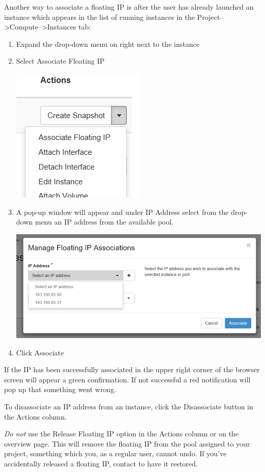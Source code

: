 Another way to associate a floating IP is after the user has already launched an instance which appears in the list of running instances in the Project-->Compute-->Instances tab:

\begin{enumerate}
\item Expand the drop-down menu on right next to the instance
\item Select Associate Floating IP
\begin{center}
\includegraphics[scale=0.7]{img/associate_IP_1.png}
\end{center}
\item A pop-up window will appear and under IP Address select from the
  drop-down menu an IP address from the available pool.
\begin{center}
\includegraphics[scale=0.5]{img/associate_IP_2.png}
\end{center}
\item Click Associate
\end{enumerate}

If the IP has been successfully associated in the upper right corner of the browser screen will appear a green confirmation. If not successful a red notification will pop up that something went wrong.

 To disassociate an IP address from an instance, click
the Disassociate button in the Actions column.

 \emph{Do not} use the Release Floating IP option in
the Actions column or on the overview page.  This will remove the
floating IP from the pool assigned to your project, something which
you, as a regular user, cannot undo.  If you've accidentally released
a floating IP, contact \cloudinfo to have it restored.

